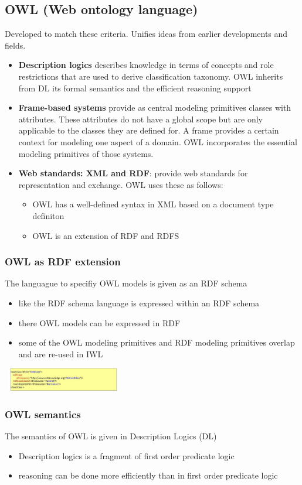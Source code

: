 \subsection{OWL (Web ontology language)}
Developed to match these criteria. Unifies ideas from earlier
developments and fields.
\begin{itemize}
\item \textbf{Description logics} describes knowledge in terms of
  concepts and role restrictions that are used to derive
  classification taxonomy. OWL inherits from DL its formal semantics
  and the efficient reasoning support
\item \textbf{Frame-based systems} provide as central modeling
  primitives classes with attributes. These attributes do not have a
  global scope but are only applicable to the classes they are defined
  for. A frame provides a certain context for modeling one aspect of a
  domain. OWL incorporates the essential modeling primitives of those
  systems.
\item \textbf{Web standards: XML and RDF}: provide web standards for
  representation and exchange. OWL uses these as follows:
  \begin{itemize}
  \item OWL has a well-defined syntax in XML based on a document type
    definiton
  \item OWL is an extension of RDF and RDFS
  \end{itemize}
\end{itemize}

\subsubsection{OWL as RDF extension}
The languague to specifiy OWL models is given as an RDF schema
\begin{itemize}
\item like the RDF schema language is expressed within an RDF schema
\item there OWL models can be expressed in RDF
\item some of the OWL modeling primitives and RDF modeling primitives
  overlap and are re-used in IWL
\end{itemize}
\includegraphics[width=200px, height=40px]{owl}

\subsubsection{OWL semantics}
The semantics of OWL is given in Description Logics (DL)
\begin{itemize}
\item Description logics is a fragment of first order predicate logic
\item reasoning can be done more efficiently  than in first order
  predicate logic
\end{itemize}

